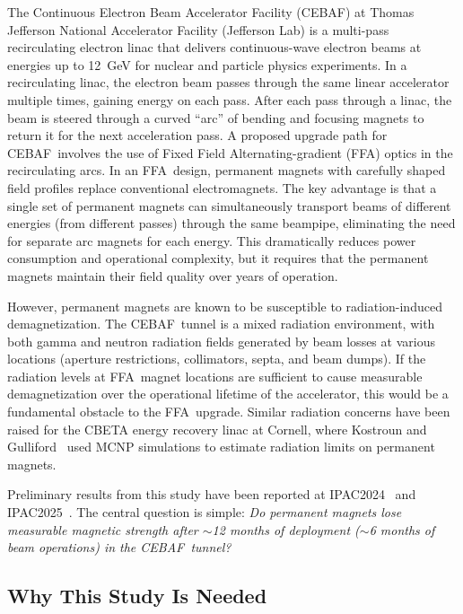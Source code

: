 \documentclass[11pt,letterpaper]{article}
\newcommand{\CEBAF}{CEBAF}
\newcommand{\FFA}{FFA}
\newcommand{\JLab}{Jefferson Lab}
\begin{document}
The Continuous Electron Beam Accelerator Facility (\CEBAF) at Thomas Jefferson
National Accelerator Facility (\JLab) is a multi-pass recirculating electron
linac that delivers continuous-wave electron beams at energies up to
\SI{12}{GeV} for nuclear and particle physics experiments. In a recirculating
linac, the electron beam passes through the same linear accelerator multiple
times, gaining energy on each pass. After each pass through a linac, the beam
is steered through a curved ``arc'' of bending and focusing magnets to return
it for the next acceleration pass. A proposed upgrade
path for \CEBAF~involves the use of Fixed Field Alternating-gradient (\FFA)
optics in the recirculating arcs. In an \FFA~design, permanent magnets with
carefully shaped field profiles replace conventional electromagnets. The key
advantage is that a single set of permanent magnets can simultaneously
transport beams of different energies (from different passes) through the
same beampipe, eliminating the need for separate arc magnets for each energy.
This dramatically reduces power consumption and operational complexity, but
it requires that the permanent magnets maintain their field quality over years
of operation.

However, permanent magnets are known to be susceptible to radiation-induced
demagnetization. The \CEBAF~tunnel is a mixed radiation environment, with both
gamma and neutron radiation fields generated by beam losses at various locations
(aperture restrictions, collimators, septa, and beam dumps). If the radiation
levels at \FFA~magnet locations are sufficient to cause measurable
demagnetization over the operational lifetime of the accelerator, this would be
a fundamental obstacle to the \FFA~upgrade. Similar radiation concerns have
been raised for the CBETA energy recovery linac at Cornell, where Kostroun and
Gulliford~\cite{Kostroun2019} used MCNP simulations to estimate radiation
limits on permanent magnets.

Preliminary results from this study have been reported at
IPAC2024~\cite{Bodenstein2024a,Bodenstein2024b} and
IPAC2025~\cite{Bodenstein2025}. The central question is simple: \textit{Do
permanent magnets lose measurable magnetic strength after $\sim$12 months
of deployment ($\sim$6 months of beam operations) in the \CEBAF~tunnel?}

\subsection{Why This Study Is Needed}
\end{document}
